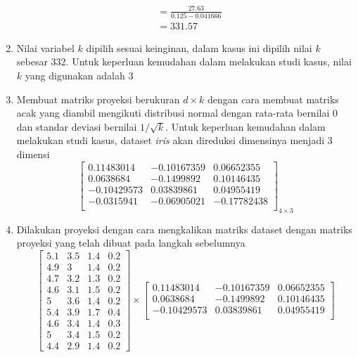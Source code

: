 \begin{enumerate}
\begin{align*}
        &= \frac{27.63}{0.125-0.041666} \\
        &= 331.57
    \end{align*}
    \item Nilai variabel \(k\) dipilih sesuai keinginan, dalam kasus ini dipilih nilai \(k\) sebesar 332. Untuk keperluan kemudahan dalam melakukan studi kasus, nilai \(k\) yang digunakan adalah 3
    \item Membuat matriks proyeksi berukuran \(d \times k\) dengan cara membuat matriks acak yang diambil mengikuti distribusi normal dengan rata-rata bernilai 0 dan standar deviasi bernilai \(1/\sqrt{k}\). Untuk keperluan kemudahan dalam melakukan studi kasus, dataset \textit{iris} akan direduksi dimensinya menjadi 3 dimensi
    \[
        \begin{bmatrix}
        0.11483014 &  -0.10167359  &  0.06652355 \\
        0.0638684 &   -0.1499892   &  0.10146435 \\
        -0.10429573 &   0.03839861 &   0.04955419 \\
        -0.0315941  &  -0.06905021  & -0.17782438 \\
        \end{bmatrix}_{4\times 3}
    \]
    \item Dilakukan proyeksi dengan cara mengkalikan matriks dataset dengan matriks proyeksi yang telah dibuat pada langkah sebelumnya
    \[
        \begin{bmatrix}
        5.1		&		3.5		&		1.4		&		0.2	\\
        4.9		&		3		&		1.4		&		0.2	\\
        4.7		&		3.2		&		1.3		&		0.2	\\
        4.6		&		3.1		&		1.5		&		0.2	\\
        5		&		3.6		&		1.4		&		0.2	\\
        5.4		&		3.9		&		1.7		&		0.4	\\
        4.6		&		3.4		&		1.4		&		0.3	\\
        5		&		3.4		&		1.5		&		0.2	\\
        4.4		&		2.9		&		1.4		&		0.2 
        \end{bmatrix}
        \times
        \begin{bmatrix}
        0.11483014 &  -0.10167359  &  0.06652355 \\
        0.0638684 &   -0.1499892   &  0.10146435 \\
        -0.10429573 &   0.03839861 &   0.04955419 \\

\end{bmatrix}\]
\end{enumerate}
